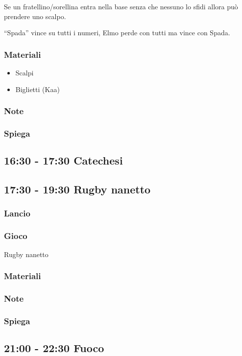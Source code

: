 \documentclass[../main.tex]{subfiles}
\begin{document}
        Se un fratellino/sorellina entra nella base senza che nessuno lo sfidi allora può prendere uno scalpo.

        “Spada” vince su tutti i numeri, Elmo perde con tutti ma vince con Spada.

        \subsubsection{Materiali}
        \begin{itemize}
            \item Scalpi
            \item Biglietti (Kaa)
        \end{itemize}
       \subsubsection{Note}
       \subsubsection{Spiega}
       
    \subsection{16:30 - 17:30 Catechesi}   
    \subsection{17:30 - 19:30 Rugby nanetto}
        \subsubsection{Lancio}
        \subsubsection{Gioco}
        Rugby nanetto 
        \subsubsection{Materiali}
        \subsubsection{Note}
        \subsubsection{Spiega}
        
    \subsection{21:00 - 22:30 Fuoco}
\end{document}
